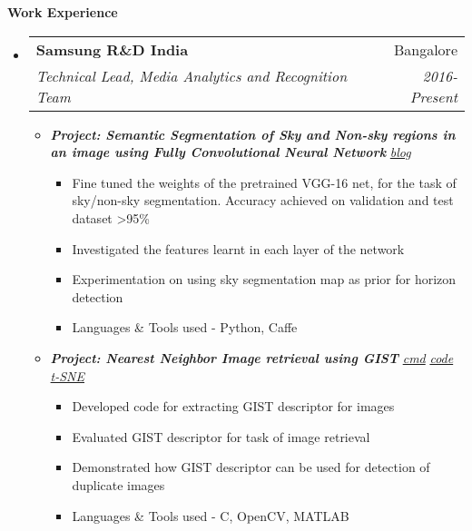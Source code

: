 \documentclass[letterpaper,11pt]{article}
\makeatletter
\def\CC{{C\nolinebreak[4]\hspace{-.05em}\raisebox{.4ex}{\tiny\bf ++}}}
\newcommand{\resitem}[1]{\item #1 \vspace{-2pt}}
\newcommand{\resheading}[1]{{\large \colorbox{mygrey}{\begin{minipage}{\textwidth}{\textbf{#1 \vphantom{p\^{E}}}}\end{minipage}}}}
\newcommand{\ressubheading}[4]{
	\begin{tabular*}{7.0in}{l@{\extracolsep{\fill}}r}
		\textbf{#1} & #2 \\
		\textit{#3} & \textit{#4} \\
	\end{tabular*}\vspace{-6pt}}
\makeatother
\begin{document}
\resheading{Work Experience}
\begin{itemize}
	\item
		\ressubheading{Samsung R\&D India}{Bangalore}{Technical Lead, Media Analytics and Recognition Team}{2016-Present}
		\vspace{1mm}
		\begin{itemize}
				\resitem[]{\faCircleO
					\hspace{1mm}\textbf{\emph{Project: Semantic Segmentation of Sky and Non-sky regions in an image using Fully Convolutional Neural Network}}\hspace{1mm}
					\faGlobe \hspace{1mm} \href{https://nrupatunga.github.io/fcn-segmentation/}{\emph{blog}}}
				\begin{itemize}
						\resitem{Fine tuned the weights of the pretrained VGG-16 net, for the task of sky/non-sky segmentation. Accuracy achieved on validation and test dataset >95\%}
						\resitem{Investigated the features learnt in each layer of the network}
						\resitem{Experimentation on using sky segmentation map as prior for horizon detection}
						\resitem{Languages \& Tools used - Python, Caffe}
				\end{itemize}
				\vspace{1mm}
				\resitem[]{\faCircleO \hspace{1mm}\textbf{\emph{Project: Nearest Neighbor Image retrieval using GIST}} \hspace{1mm}
					\faWrench \hspace{1mm} \href{https://github.com/nrupatunga/GIST-global-Image-Descripor}{\emph{cmd}}
					\faGithub \hspace{1mm} \href{https://github.com/nrupatunga/GIST-global-Image-Descripor}{\emph{code}}
					\faImage \hspace{1mm} \href{https://nrupatunga.github.io/project/gist/t-sne/gist-nn-large.png}{\emph{t-SNE}}}
				\begin{itemize}
						\resitem{Developed code for extracting GIST descriptor for images}
						\resitem{Evaluated GIST descriptor for task of image retrieval}
						\resitem{Demonstrated how GIST descriptor can be used for detection of duplicate images }
						\resitem{Languages \& Tools used - \CC, OpenCV, MATLAB}
				\end{itemize}
		\end{itemize}

\end{itemize}
\end{document}
